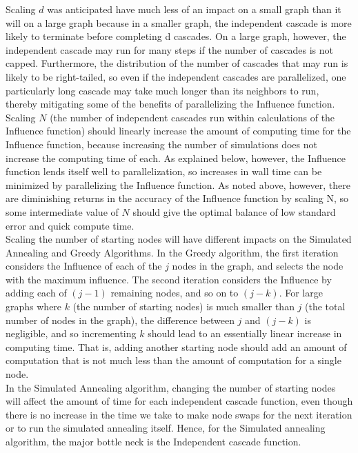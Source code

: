 \documentclass[11pt]{scrartcl} %
\begin{document}
Scaling $d$ was anticipated have much less of an impact on a small graph than it will on a large graph because in a smaller graph, the independent cascade is more likely to terminate before completing d cascades.  On a large graph, however, the independent cascade may run for many steps if the number of cascades is not capped.  Furthermore, the distribution of the number of cascades that may run is likely to be right-tailed, so even if the independent cascades are parallelized, one particularly long cascade may take much longer than its neighbors to run, thereby mitigating some of the benefits of parallelizing the Influence function.\\

Scaling $N$ (the number of independent cascades run within calculations of the Influence function) should linearly increase the amount of computing time for the Influence function, because increasing the number of simulations does not increase the computing time of each.  As explained below, however, the Influence function lends itself well to parallelization, so increases in wall time can be minimized by parallelizing the Influence function.  As noted above, however, there are diminishing returns in the accuracy of the Influence function by scaling N, so some intermediate value of $N$ should give the optimal balance of low standard error and quick compute time.\\

Scaling the number of starting nodes will have different impacts on the Simulated Annealing and Greedy Algorithms. In the Greedy algorithm, the first iteration considers the Influence of each of the $j$ nodes in the graph, and selects the node with the maximum influence.  The second iteration considers the Influence by adding each of $(j-1)$ remaining nodes, and so on to $(j-k)$.  For large graphs where $k$ (the number of starting nodes) is much smaller than $j$ (the total number of nodes in the graph), the difference between $j$ and $(j-k)$ is negligible, and so incrementing $k$ should lead to an essentially linear increase in computing time.  That is, adding another starting node should add an amount of computation that is not much less than the amount of computation for a single node.\\

In the Simulated Annealing algorithm, changing the number of starting nodes will affect the amount of time for each independent cascade function, even though there is no increase in the time we take to make node swaps for the next iteration or to run the simulated annealing itself. Hence, for the Simulated annealing algorithm, the major bottle neck is the Independent cascade function. \\
\end{document}
